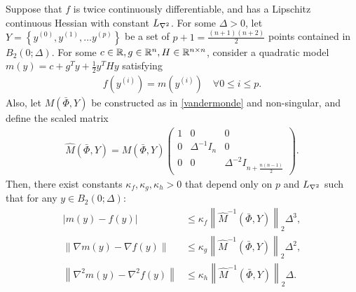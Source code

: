 \begin{theorem}
\label{3_16_replacement}
Suppose that $f$ is twice continuously differentiable, and has a Lipschitz continuous Hessian with constant ${L_{\nabla^2}}$.
For some $\Delta > 0$, let $Y = \left\{y^{(0)}, y^{(1)}, \ldots y^{(p)} \right\}$ be a set of
$p+1=\frac{(n+1)(n+2)}{2}$ points contained in $B_2\left(0; \Delta\right)$.
For some $c \in \mathbb R, g \in \mathbb R^n, H \in \mathbb R^{n \times n}$, consider a quadratic model $m(y) = c + g^T y + \frac 1 2 y^T H y$  satisfying
\begin{align}
f\left(y^{(i)}\right) = m\left(y^{(i)}\right) \quad \forall 0 \le i \le p. \label{nce_interpolation_condition}
\end{align}
Also, let $M(\bar \Phi,Y)$ be constructed as in \cref{vandermonde} and non-singular, and define the scaled matrix
\begin{align}
\hat M(\bar \Phi, Y) = M(\bar \Phi,Y) \begin{pmatrix}
1 & 0 & 0 \\
0 & \Delta^{-1} I_n & 0 \\
0 & 0 & \Delta^{-2} I_{n + \frac{n(n-1)}{2}}
\end{pmatrix}. \label{nce_scale}
\end{align}
Then, there exist constants $\kappa_f, \kappa_g, \kappa_h>0$ that depend only on $p$ and ${L_{\nabla^2}}$ such that
for any $y \in B_2\left(0; \Delta\right)$:
\begin{align*}
\left|m(y) - f(y)\right| &\le \kappa_f \left\|\hat M^{-1}(\bar \Phi, Y) \right\|_2 \Delta^3, \\
\left\|\nabla m(y) - \nabla f(y)\right\| &\le \kappa_g \left\|\hat M^{-1}(\bar \Phi, Y) \right\|_2\Delta^2, \\
\left\|\nabla^2 m(y) - \nabla^2 f(y)\right\| &\le \kappa_h \left\|\hat M^{-1}(\bar \Phi, Y) \right\|_2\Delta.
\end{align*}
\end{theorem}

